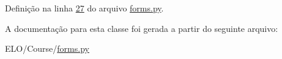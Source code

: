 Definição na linha \hyperlink{Course_2forms_8py_source_l00027}{27} do arquivo \hyperlink{Course_2forms_8py_source}{forms.\+py}.



A documentação para esta classe foi gerada a partir do seguinte arquivo\+:\begin{DoxyCompactItemize}
\item 
E\+L\+O/\+Course/\hyperlink{Course_2forms_8py}{forms.\+py}\end{DoxyCompactItemize}
